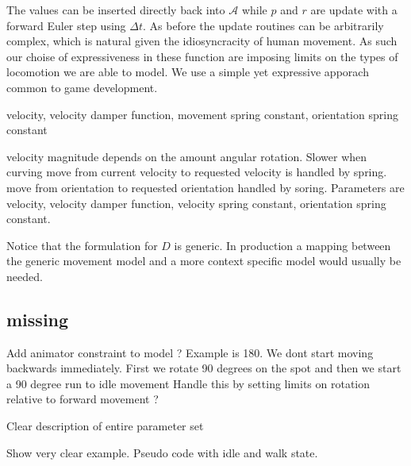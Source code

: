 The values can be inserted directly back into $\mathcal{A}$ while $p$ and $r$ are update with a forward Euler step using $\Delta{t}$. As before the update routines can be arbitrarily complex, which is natural given the idiosyncracity of human movement. As such our choise of expressiveness in these function are imposing limits on the types of locomotion we are able to model. We use a simple yet expressive apporach common to game development.   

velocity, velocity damper function, movement spring constant, orientation spring constant

velocity magnitude depends on the amount angular rotation. Slower when curving
move from current velocity to requested velocity is handled by spring.
move from orientation to requested orientation handled by soring.
Parameters are velocity, velocity damper function, velocity spring constant, orientation spring constant.


Notice that the formulation for $D$ is generic. In production a mapping between the generic movement model and a more context specific model would usually be needed. 

\subsection{missing}
Add animator constraint to model ? Example is 180. We dont start moving backwards immediately. First we rotate 90 degrees on the spot and then we start a 90 degree run to idle movement
Handle this by setting limits on rotation relative to forward movement ?

Clear description of entire parameter set

Show very clear example. Pseudo code with idle and walk state. 